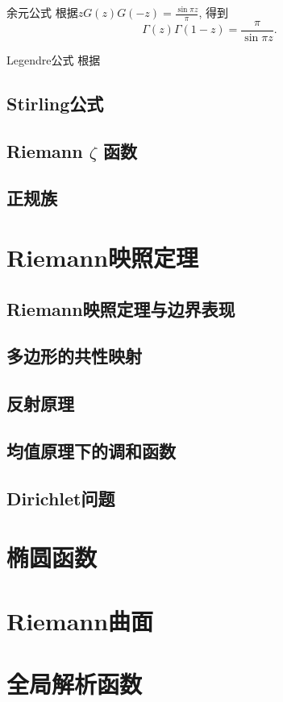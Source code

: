 \documentclass[UTF8]{ctexart}
\begin{document}
        \begin{ppt}
            {余元公式}
            根据$zG(z)G(-z)=\frac{\sin\pi z}{\pi}$, 得到
            \[\Gamma(z)\Gamma(1-z)=\frac{\pi}{\sin\pi z}.\]
        \end{ppt}

        \begin{ppt}
            {Legendre公式}
            根据
        \end{ppt}

    \subsection{Stirling公式}

    \subsection{Riemann  \(\zeta\)  函数}

    \subsection{正规族}

\section{Riemann映照定理}
    
    \subsection{Riemann映照定理与边界表现}
    
    \subsection{多边形的共性映射}
    
    \subsection{反射原理}
    
    \subsection{均值原理下的调和函数}
    
    \subsection{Dirichlet问题}

\section{椭圆函数}

\section{Riemann曲面}

\section{全局解析函数}
\end{document}
